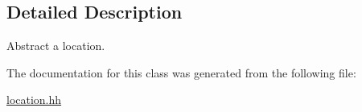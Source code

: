 \subsection{Detailed Description}
Abstract a location. 

The documentation for this class was generated from the following file\+:\begin{DoxyCompactItemize}
\item 
\hyperlink{location_8hh}{location.\+hh}\end{DoxyCompactItemize}

